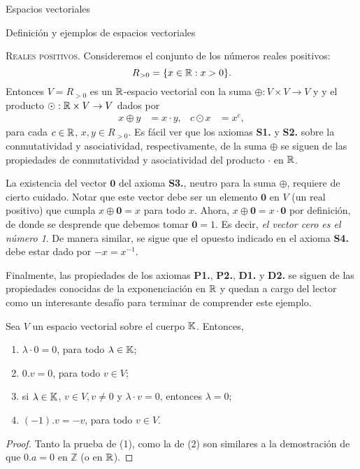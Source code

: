 \begin{chapter}{Espacios vectoriales}
\begin{section}{Definici\'on y ejemplos de espacios vectoriales}
            
            
            \medspace
            
            \begin{ejemplo*}{\textsc{Reales positivos.}}
            Consideremos el conjunto de los números reales positivos:
            \[
            R_{>0}=\{x\in\mathbb R : x>0\}.
            \]
            Entonces $V=R_{>0}$ es un $\mathbb R$-espacio vectorial con la suma $\oplus:V\times V\to V$ y  y el producto $\odot:\mathbb R\times V\to V$ dados por
            \begin{align*}
            x\oplus y&=x\cdot y, & c\odot x&=x^c,
            \end{align*}
            para cada $c\in\mathbb R$, $x,y\in R_{>0}$.
Es fácil ver que los axiomas \textbf{S1.} y \textbf{S2.} sobre la conmutatividad y asociatividad, respectivamente, de la suma $\oplus$ se siguen de las propiedades de conmutatividad y asociatividad del producto $\cdot$ en $\mathbb R$.

La existencia del vector $\textbf{0}$ del axioma \textbf{S3.}, neutro para la suma $\oplus$, requiere de cierto cuidado. Notar que este vector debe ser un elemento $\mathbf{0}$ en $V$ (un real positivo) que cumpla $x\oplus \mathbf{0}=x$ para todo $x$. Ahora, $x\oplus \textbf{0}=x\cdot \textbf{0}$ por definición, de donde se desprende que debemos tomar $\mathbf{0}=1$. Es decir, \textit{el vector cero es el número 1}. De manera similar, se sigue que el opuesto indicado en el  axioma \textbf{S4.} debe estar dado por $-x=x^{-1}$.

Finalmente, las propiedades de los axiomas \textbf{P1.}, \textbf{P2.}, \textbf{D1.} y \textbf{D2.} se siguen de las propiedades conocidas de la exponenciación en $\mathbb R$ y quedan a cargo del lector como un interesante desafío para terminar de comprender este ejemplo.
\end{ejemplo*}            

            \begin{proposicion}\label{prop-basicas-ev} Sea $V$ un espacio vectorial sobre el cuerpo $\mathbb K$. Entonces,
                \begin{enumerate}
                    \item\label{c*0=0} $\lambda\cdot 0=0$, para todo $\lambda \in \mathbb K$;
                    \item\label{0*c=0} $0.v = 0$, para todo $v \in V$;
                    \item\label{c*v=0} si $\lambda \in \mathbb K$, $v \in V, v\ne 0$ y $\lambda\cdot v=0$,  entonces $\lambda =0$;
                    \item\label{-1*v=-v} $(-1).v = -v$, para todo $v \in V$.
                \end{enumerate}
            \end{proposicion}
            \begin{proof} Tanto la prueba de (1), como la de (2) son similares a la demostración de que $0.a=0$  en $\mathbb Z$ (o en  $\mathbb R$).
                 

\end{proof}
\end{section}
\end{chapter}
